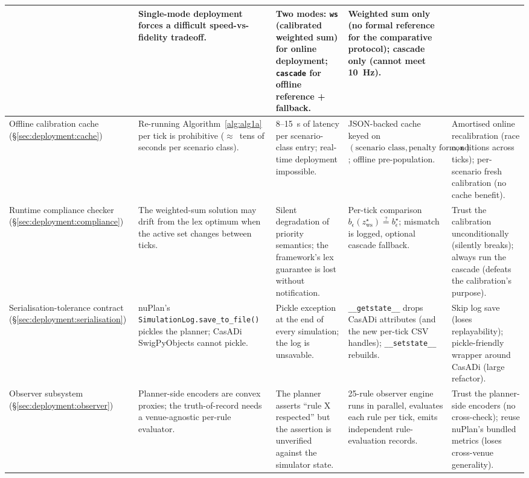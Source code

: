 \begin{table}[t]
\begin{tabularx}{\linewidth}{@{}l X X X X@{}}
            & Single-mode deployment forces a difficult speed-vs-fidelity tradeoff.
            & Two modes: \texttt{ws} (calibrated weighted sum) for online deployment; \texttt{cascade} for offline reference + fallback.
            & Weighted sum only (no formal reference for the comparative protocol); cascade only (cannot meet 10~Hz). \\
        \midrule
        Offline calibration cache (\S\ref{sec:deployment:cache})
            & Re-running Algorithm~\ref{alg:alg1a} per tick is prohibitive ($\approx$~tens of seconds per scenario class).
            & 8--15~s of latency per scenario-class entry; real-time deployment impossible.
            & JSON-backed cache keyed on $(\text{scenario class}, \text{penalty form}, \boldsymbol{\epsilon})$; offline pre-population.
            & Amortised online recalibration (race conditions across ticks); per-scenario fresh calibration (no cache benefit). \\
        \midrule
        Runtime compliance checker (\S\ref{sec:deployment:compliance})
            & The weighted-sum solution may drift from the lex optimum when the active set changes between ticks.
            & Silent degradation of priority semantics; the framework's lex guarantee is lost without notification.
            & Per-tick comparison $b_{\epsilon}(z_{\mathrm{ws}}^{\star}) \stackrel{?}{=} b_{\epsilon}^{\star}$; mismatch is logged, optional cascade fallback.
            & Trust the calibration unconditionally (silently breaks); always run the cascade (defeats the calibration's purpose). \\
        \midrule
        Serialisation-tolerance contract (\S\ref{sec:deployment:serialisation})
            & nuPlan's \texttt{SimulationLog.save\_to\_file()} pickles the planner; CasADi SwigPyObjects cannot pickle.
            & Pickle exception at the end of every simulation; the log is unsavable.
            & \texttt{\_\_getstate\_\_} drops CasADi attributes (and the new per-tick CSV handles); \texttt{\_\_setstate\_\_} rebuilds.
            & Skip log save (loses replayability); pickle-friendly wrapper around CasADi (large refactor). \\
        \midrule
        Observer subsystem (\S\ref{sec:deployment:observer})
            & Planner-side encoders are convex proxies; the truth-of-record needs a venue-agnostic per-rule evaluator.
            & The planner asserts ``rule X respected'' but the assertion is unverified against the simulator state.
            & 25-rule observer engine runs in parallel, evaluates each rule per tick, emits independent rule-evaluation records.
            & Trust the planner-side encoders (no cross-check); reuse nuPlan's bundled metrics (loses cross-venue generality). \\
        \bottomrule
    \end{tabularx}
\end{table}

